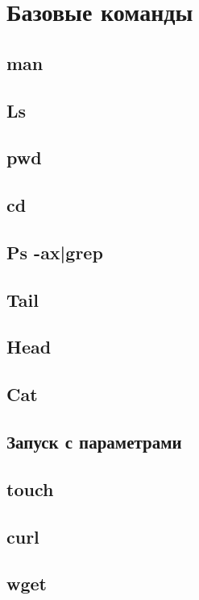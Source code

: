 \section{Базовые команды}
\label{sec:commands}
\subsection{man}
\subsection{Ls}
\subsection{pwd}
\subsection{cd}
\subsection{Ps -ax|grep}
\subsection{Tail}
\subsection{Head}
\subsection{Cat}
\subsection{Запуск с параметрами}
\subsection{touch}
\subsection{curl}
\subsection{wget}
\newpage
